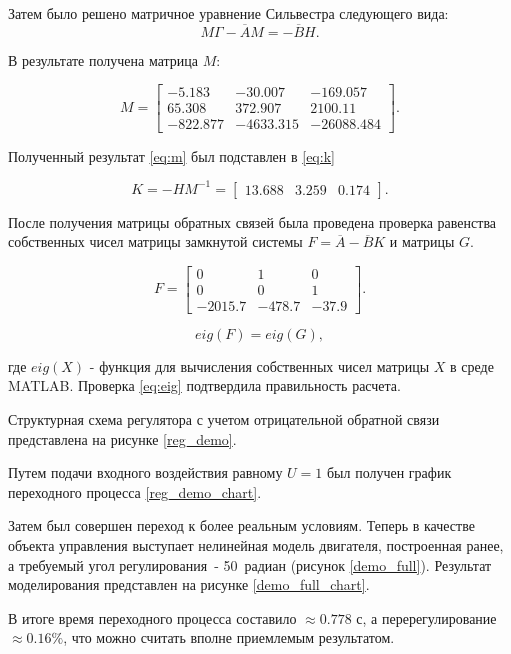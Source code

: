 Затем было решено матричное уравнение Сильвестра следующего вида:
$$
  M\Gamma-\overline{A}M=-\overline{B}H.
$$

В результате получена матрица $M$:

\begin{equation}
  M=\begin{bmatrix}-5.183&-30.007&-169.057\\65.308&372.907&2100.11\\-822.877&-4633.315&-26088.484\end{bmatrix}.
  \label{eq:m}
\end{equation}

Полученный результат \ref{eq:m} был подставлен в \ref{eq:k}

\begin{equation}
  K=-HM^{-1}=\begin{bmatrix}13.688&3.259&0.174\end{bmatrix}.
  \label{eq:k}
\end{equation}

После получения матрицы обратных связей была проведена проверка равенства
собственных чисел матрицы замкнутой системы $F = \overline{A} - \overline{B}K$ и матрицы $G$.

$$
  F = \begin{bmatrix}0&1&0\\0&0&1\\-2015.7&-478.7&-37.9\end{bmatrix}.
$$

\begin{equation}
  eig(F) = eig(G),
  \label{eq:eig}
\end{equation}

где $eig(X)$ - функция для вычисления собственных чисел матрицы $X$ в среде MATLAB.
Проверка \ref{eq:eig} подтвердила правильность расчета.

Структурная схема регулятора с учетом отрицательной обратной связи представлена на рисунке \ref{reg_demo}.


Путем подачи входного воздействия равному $U=1$ был получен график переходного процесса \ref{reg_demo_chart}.


Затем был совершен переход к более реальным условиям. Теперь в качестве объекта управления
выступает нелинейная модель двигателя, построенная ранее, а требуемый угол 
регулирования~- 50~радиан (рисунок \ref{demo_full}). Результат моделирования 
представлен на рисунке \ref{demo_full_chart}.



В итоге время переходного процесса составило $\approx0.778$ с, а перерегулирование $\approx0.16\%$,
что можно считать вполне приемлемым результатом.